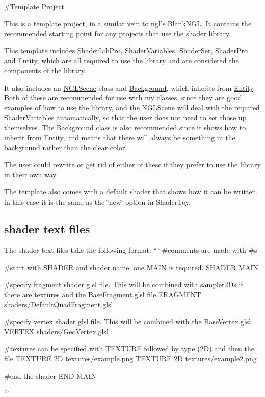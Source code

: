 \#\-Template Project

This is a template project, in a similar vein to ngl's Blank\-N\-G\-L. It contains the recommended starting point for any projects that use the shader library.

This template includes \hyperlink{class_shader_lib_pro}{Shader\-Lib\-Pro}, \hyperlink{struct_shader_variables}{Shader\-Variables}, \hyperlink{class_shader_set}{Shader\-Set}, \hyperlink{struct_shader_pro}{Shader\-Pro} and \hyperlink{class_entity}{Entity}, which are all required to use the library and are considered the components of the library.

It also includes an \hyperlink{class_n_g_l_scene}{N\-G\-L\-Scene} class and \hyperlink{class_background}{Background}, which inherits from \hyperlink{class_entity}{Entity}. Both of these are recommended for use with my classes, since they are good examples of how to use the library, and the \hyperlink{class_n_g_l_scene}{N\-G\-L\-Scene} will deal with the required \hyperlink{struct_shader_variables}{Shader\-Variables} automatically, so that the user does not need to set those up themselves. The \hyperlink{class_background}{Background} class is also recommended since it shows how to inherit from \hyperlink{class_entity}{Entity}, and means that there will always be something in the background rather than the clear color.

The user could rewrite or get rid of either of these if they prefer to use the library in their own way.

The template also comes with a default shader that shows how it can be written, in this case it is the same as the \char`\"{}new\char`\"{} option in Shader\-Toy.

\subsection*{shader text files}

The shader text files take the following format\-: ``` \#comments are made with \#s

\#start with S\-H\-A\-D\-E\-R and shader name. one M\-A\-I\-N is required. S\-H\-A\-D\-E\-R M\-A\-I\-N

\#specify fragment shader glsl file. This will be combined with sampler2\-Ds if there are textures and the Base\-Fragment.\-glsl file F\-R\-A\-G\-M\-E\-N\-T shaders/\-Default\-Quad\-Fragment.\-glsl

\#specify vertex shader glsl file. This will be combined with the Base\-Vertex.\-glsl V\-E\-R\-T\-E\-X shaders/\-Geo\-Vertex.\-glsl

\#textures can be specified with T\-E\-X\-T\-U\-R\-E followed by type (2\-D) and then the file T\-E\-X\-T\-U\-R\-E 2\-D textures/example.\-png T\-E\-X\-T\-U\-R\-E 2\-D textures/example2.\-png

\#end the shader E\-N\-D M\-A\-I\-N

``` 